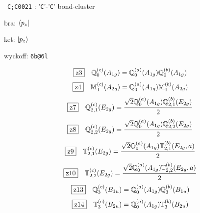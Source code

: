 \documentclass[fleqn,10pt,landscape]{jsarticle}
\begin{document}
\noindent\textbullet\, \texttt{C;C\texttt{}002\texttt{}1} : '\texttt{C}'-'\texttt{C}' bond-cluster

\noindent\quad * bra: $\bra{p_{z}}$

\noindent\quad * ket: $\ket{p_{z}}$

\noindent\quad * wyckoff: \texttt{6b@6l}

\begin{dmath*}
\hspace*{3mm}\fbox{z3}\quad \mathbb{Q}_{0}^{(c)}(A_{1g})=\mathbb{Q}_{0}^{(a)}(A_{1g}) \mathbb{Q}_{0}^{(b)}(A_{1g})
\end{dmath*}
\begin{dmath*}
\hspace*{3mm}\fbox{z4}\quad \mathbb{M}_{1}^{(c)}(A_{2g})=\mathbb{Q}_{0}^{(a)}(A_{1g}) \mathbb{M}_{1}^{(b)}(A_{2g})
\end{dmath*}
\begin{dmath*}
\hspace*{3mm}\fbox{z7}\quad \mathbb{Q}_{2,1}^{(c)}(E_{2g})=\frac{\sqrt{2} \mathbb{Q}_{0}^{(a)}(A_{1g}) \mathbb{Q}_{2,1}^{(b)}(E_{2g})}{2}
\end{dmath*}
\begin{dmath*}
\hspace*{3mm}\fbox{z8}\quad \mathbb{Q}_{2,2}^{(c)}(E_{2g})=\frac{\sqrt{2} \mathbb{Q}_{0}^{(a)}(A_{1g}) \mathbb{Q}_{2,2}^{(b)}(E_{2g})}{2}
\end{dmath*}
\begin{dmath*}
\hspace*{3mm}\fbox{z9}\quad \mathbb{T}_{2,1}^{(c)}(E_{2g})=\frac{\sqrt{2} \mathbb{Q}_{0}^{(a)}(A_{1g}) \mathbb{T}_{2,1}^{(b)}(E_{2g},a)}{2}
\end{dmath*}
\begin{dmath*}
\hspace*{3mm}\fbox{z10}\quad \mathbb{T}_{2,2}^{(c)}(E_{2g})=\frac{\sqrt{2} \mathbb{Q}_{0}^{(a)}(A_{1g}) \mathbb{T}_{2,2}^{(b)}(E_{2g},a)}{2}
\end{dmath*}
\begin{dmath*}
\hspace*{3mm}\fbox{z13}\quad \mathbb{Q}_{3}^{(c)}(B_{1u})=\mathbb{Q}_{0}^{(a)}(A_{1g}) \mathbb{Q}_{3}^{(b)}(B_{1u})
\end{dmath*}
\begin{dmath*}
\hspace*{3mm}\fbox{z14}\quad \mathbb{T}_{3}^{(c)}(B_{2u})=\mathbb{Q}_{0}^{(a)}(A_{1g}) \mathbb{T}_{3}^{(b)}(B_{2u})
\end{dmath*}
\end{document}
